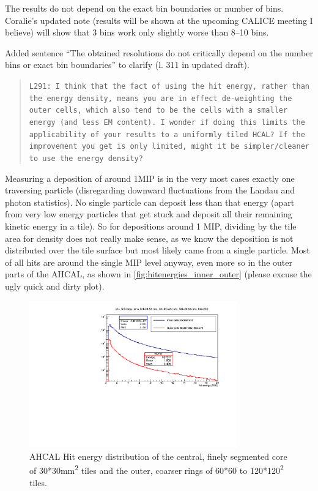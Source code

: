 \documentclass[twoside,a4paper,12pt]{article}
\begin{document}
The results do not depend on the exact bin boundaries or number of bins. Coralie's updated note (results will be shown at the upcoming CALICE meeting I believe) will show that 3 bins work only slightly worse than 8--10 bins. 

Added sentence ``The obtained resolutions do not critically depend on the number bins or exact bin boundaries'' to clarify (l. 311 in updated draft).

\begin{quote}\texttt{L291: I think that the fact of using the hit energy, rather than the energy density, means you are in effect
de-weighting the outer cells, which also tend to be the cells with a smaller energy (and less EM content).
I wonder if doing this limits the applicability of your results to a uniformly tiled HCAL?
If the improvement you get is only limited, might it be simpler/cleaner to use the energy density?}\end{quote}
Measuring a deposition of around 1MIP is in the very most cases exactly one traversing particle (disregarding downward fluctuations from the Landau and photon statistics). No single particle can deposit less than that energy (apart from very low energy particles that get stuck and deposit all their remaining kinetic energy in a tile). So for depositions around 1 MIP, dividing by the tile area for density does not really make sense, as we know the deposition is not distributed over the tile surface but most likely came from a single particle. Most of all hits are around the single MIP level anyway, even more so in the outer parts of the AHCAL, as shown in \autoref{fig:hitenergies_inner_outer} (please excuse the ugly quick and dirty plot).
\begin{figure}[htbp]
\begin{center}
\includegraphics[width=0.8\textwidth,page=1]{hitenergy_AHCAL_inner_vs_outer_cells_560474_MC}
\caption{AHCAL Hit energy distribution of the central, finely segmented core of 30*30mm\textsuperscript{2} tiles and the outer, coarser rings of 60*60 to 120*120\textsuperscript{2} tiles.}
\label{fig:hitenergies_inner_outer}
\end{center}
\end{figure}
\end{document}
